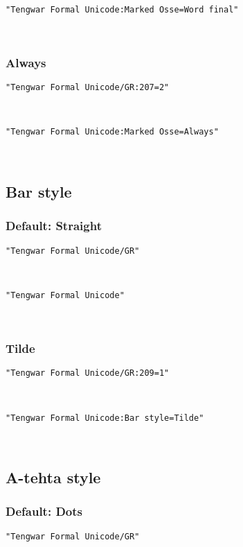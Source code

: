 \documentclass[11pt,a4paper]{article}
\begin{document}
\formalGRossefinal 

\noindent \texttt{"Tengwar Formal Unicode:Marked Osse=Word final"}

\formalAATossefinal 

\subsubsection{Always}

\texttt{"Tengwar Formal Unicode/GR:207=2"}

\formalGRossealways 

\noindent \texttt{"Tengwar Formal Unicode:Marked Osse=Always"}

\formalAATossealways 


\subsection{Bar style}

\subsubsection{Default: Straight}

\texttt{"Tengwar Formal Unicode/GR"}

\formalGR 

\noindent \texttt{"Tengwar Formal Unicode"}

\formalAAT 

\subsubsection{Tilde}

\texttt{"Tengwar Formal Unicode/GR:209=1"}

\formalGRtilde 

\noindent \texttt{"Tengwar Formal Unicode:Bar style=Tilde"}

\formalAATtilde 


\subsection{A-tehta style}

\subsubsection{Default: Dots}

\texttt{"Tengwar Formal Unicode/GR"}
\end{document}
